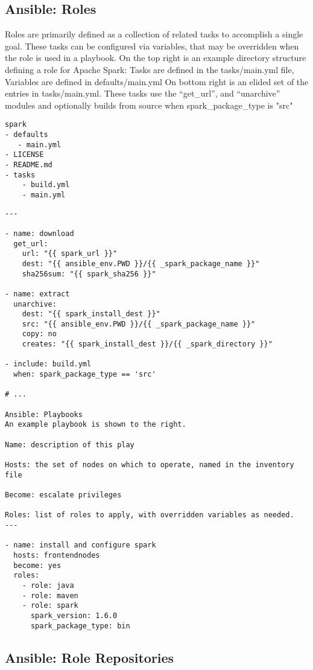 \subsection{Ansible: Roles}
Roles are primarily defined as a collection of related tasks to accomplish a single goal.  These tasks can be configured via variables, that may be overridden when the role is used in a playbook.
On the top right is an example directory structure defining a role for Apache Spark: Tasks are defined in the tasks/main.yml file, Variables are defined in defaults/main.yml
On bottom right is an elided set of the entries in tasks/main.yml. These tasks use the ``get\_url'', and ``unarchive'' modules and optionally builds from source when spark\_package\_type is "src"
\begin{Verbatim}
spark
- defaults
   - main.yml
- LICENSE
- README.md
- tasks
    - build.yml
    - main.yml
\end{Verbatim}

\begin{Verbatim}
---

- name: download
  get_url:
    url: "{{ spark_url }}"
    dest: "{{ ansible_env.PWD }}/{{ _spark_package_name }}"
    sha256sum: "{{ spark_sha256 }}"
  
- name: extract
  unarchive:
    dest: "{{ spark_install_dest }}"
    src: "{{ ansible_env.PWD }}/{{ _spark_package_name }}"
    copy: no
    creates: "{{ spark_install_dest }}/{{ _spark_directory }}"
  
- include: build.yml
  when: spark_package_type == 'src'

# ...

Ansible: Playbooks
An example playbook is shown to the right.

Name: description of this play

Hosts: the set of nodes on which to operate, named in the inventory file

Become: escalate privileges

Roles: list of roles to apply, with overridden variables as needed.
---

- name: install and configure spark
  hosts: frontendnodes
  become: yes
  roles:
    - role: java
    - role: maven
    - role: spark
      spark_version: 1.6.0
      spark_package_type: bin
\end{Verbatim}


\subsection{Ansible: Role Repositories}

